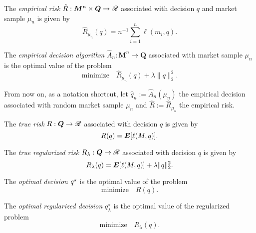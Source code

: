 \documentclass[11pt]{article}
\begin{document}
\begin{deff}
  The \textsl{empirical risk} $\hat R: \bm M^n\times \bm Q \to \mathscr{R}$ associated with decision
  $q$ and market sample $\mu_n$ is given by
 \begin{equation*}
   \hat R_{\mu_n}(q) = n^{-1} \sum_{i=1}^n \ell(m_i,q).
 \end{equation*}
\end{deff}

\begin{deff}
  The \textsl{empirical decision algorithm} $\hat A_n:\bm M^n \to \bm Q$ associated with
  market sample $\mu_n$ is the optimal value of the problem
  \begin{equation*}
    \text{minimize}\quad\hat R_{\mu_n}(q) + \lambda\|q\|_2^2.
  \end{equation*}
\end{deff}

From now on, as a notation shortcut, let $\hat q_n := \hat A_n(\mu_n)$ the empirical
decision associated with random market sample $\mu_n$ and $\hat R:=\hat R_{\mu_n}$ the
empirical risk.

\begin{deff}
  The \textsl{true risk} $R:\bm Q\to\mathscr{R}$ associated with decision $q$ is given by
  \begin{equation*}
    R(q) = \bm E[\ell(M,q)].
  \end{equation*}
\end{deff}

\begin{deff}
  The \textsl{true regularized risk} $R_\lambda:\bm Q\to\mathscr{R}$ associated with decision $q$
  is given by 
  \begin{equation*}
    R_\lambda(q) = \bm E[\ell(M,q)] + \lambda\|q\|^2_2.
  \end{equation*}
\end{deff}

\begin{deff}
  The \textsl{optimal decision} ${q^\star}$ is the optimal value of the problem
  \begin{equation*}
    \text{minimize}\quad R(q).
  \end{equation*}
\end{deff}

\begin{deff}
  The \textsl{optimal regularized decision} $q^\star_\lambda$ is the optimal value of the
  regularized problem 
  \begin{equation*}
        \text{minimize}\quad R_\lambda(q).
  \end{equation*}
\end{deff}
\end{document}
